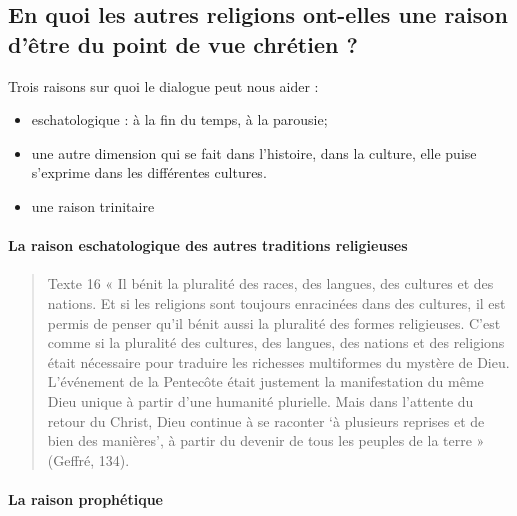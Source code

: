 \subsection{En quoi les autres religions ont-elles une raison d’être du point de vue chrétien ?}  




	
	Trois raisons sur quoi le dialogue peut nous aider :
	\begin{itemize}
	    \item  eschatologique :  à la fin du temps, à la parousie;
	  \item  une autre dimension qui se fait dans l’histoire, dans la culture, elle puise s’exprime dans les différentes cultures.
	  \item une raison trinitaire
	  	\end{itemize}

\paragraph{La raison eschatologique des autres traditions religieuses}
\begin{quote}
    Texte 16  « Il bénit la pluralité des races, des langues, des cultures et des nations. Et si les religions sont toujours enracinées dans des cultures, il est permis de penser qu’il bénit aussi la pluralité des formes religieuses. C’est comme si la pluralité des cultures, des langues, des nations et des religions était nécessaire pour traduire les richesses multiformes du mystère de Dieu. L’événement de la Pentecôte était justement la manifestation du même Dieu unique à partir d’une humanité plurielle. Mais dans l’attente du retour du Christ, Dieu continue à se raconter ‘à plusieurs reprises et de bien des manières’, à partir du devenir de tous les peuples de la terre » (Geffré, 134). 

\end{quote}
\paragraph{La raison prophétique }
